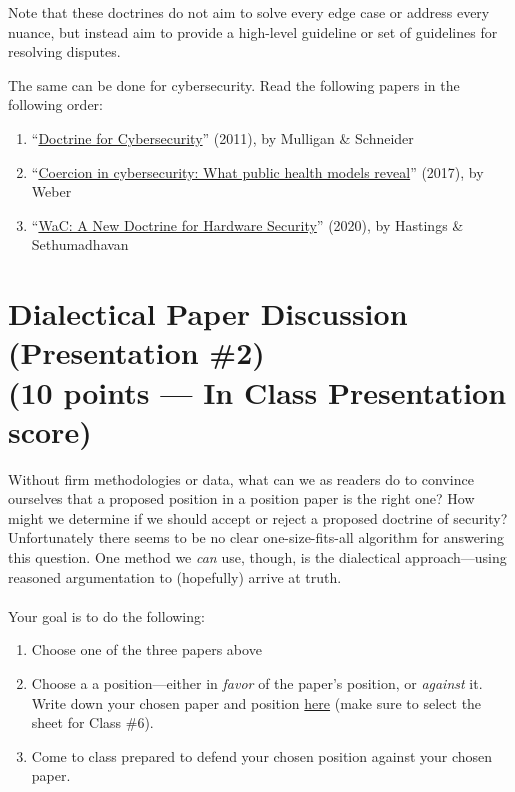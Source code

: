 \documentclass[11pt]{article}
\begin{document}
Note that these doctrines do not aim to solve every edge case or address every nuance, but instead aim to provide a high-level guideline or set of guidelines for resolving disputes. 

The same can be done for cybersecurity.
Read the following papers in the following order: 

\begin{enumerate}
    \item ``\href{https://direct.mit.edu/daed/article/140/4/70/26918/Doctrine-for-Cybersecurity}{Doctrine for Cybersecurity}'' (2011), by Mulligan \& Schneider
    \item ``\href{https://academic.oup.com/cybersecurity/article/3/3/173/3836936?searchresult=1}{Coercion in cybersecurity: What public health models reveal}'' (2017), by Weber
    \item ``\href{https://dl.acm.org/doi/abs/10.1145/3411504.3421217}{WaC: A New Doctrine for Hardware Security}'' (2020), by Hastings \& Sethumadhavan
\end{enumerate}


\section*{Dialectical Paper Discussion (Presentation \#2)\\ (10 points --- In Class Presentation score)}

Without firm methodologies or data, what can we as readers do to convince ourselves that a proposed position in a position paper is the right one? 
How might we determine if we should accept or reject a proposed doctrine of security?
Unfortunately there seems to be no clear one-size-fits-all algorithm for answering this question.
One method we \textit{can} use, though, is the dialectical approach---using reasoned argumentation to (hopefully) arrive at truth.
\\
\\
Your goal is to do the following:

\begin{enumerate}
    \item Choose one of the three papers above
    \item Choose a a position---either in \textit{favor} of the paper's position, or \textit{against} it. Write down your chosen paper and position \href{https://docs.google.com/spreadsheets/d/1SdaMpeCo4CE8o0U_irGhWmVXJYHybRWoiX4uwZYMhCE/edit?usp=sharing}{here} (make sure to select the sheet for Class \#6).
    \item Come to class prepared to defend your chosen position against your chosen paper. 
\end{enumerate}
\end{document}

